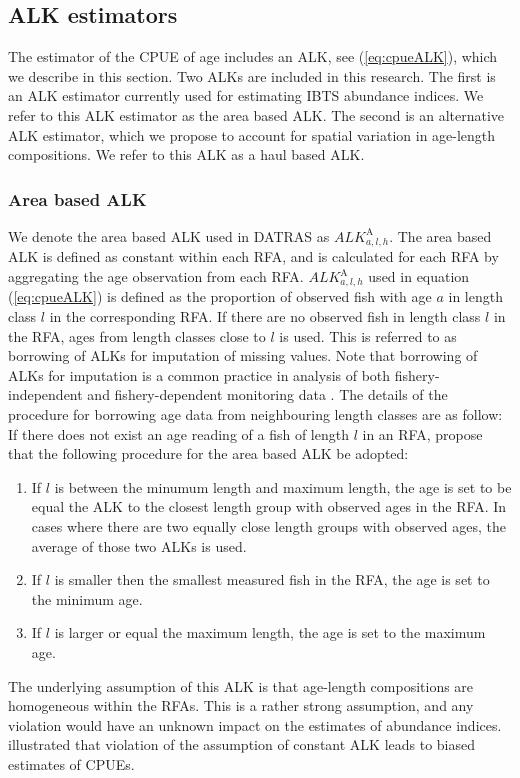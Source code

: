 \documentclass[a4paper 12pt]{article}
\numberwithin{equation}{section}
\begin{document}
\subsection{ALK estimators}
\label{sec:alkmethods}
The estimator of the CPUE of age includes an ALK, see (\ref{eq:cpueALK}), which we describe in this section. Two ALKs are included in this research. The first is an ALK estimator currently used for estimating IBTS abundance indices. We refer to this ALK estimator as the area based ALK. The second is an alternative ALK estimator, which we propose to account for spatial variation in age-length compositions. We refer to this ALK as a haul based ALK.

\subsubsection{Area based ALK}
\label{sec:datrasalkestimator}

We denote the area based ALK used in DATRAS as $ALK^{\text{A}}_{a,l,h}$. The area based ALK is defined as constant within each RFA, and is calculated for each RFA by aggregating the age observation from each RFA. $ALK^{\text{A}}_{a,l,h}$ used in equation (\ref{eq:cpueALK}) is defined as the proportion of observed fish with age $a$ in length class $l$ in the corresponding RFA. If there are no observed fish in length class $l$ in the RFA, ages from length classes close to $l$ is used. This is referred to as borrowing of ALKs for imputation of missing values. Note that borrowing of ALKs for imputation is a common practice in analysis of both fishery-independent and fishery-dependent monitoring data \citep[see for example,][]{aanes2015efficient,catchpole2017challenges}. The details of the procedure for borrowing age data from neighbouring length classes are as follow: If there does not exist an age reading of a fish of length $l$ in an RFA,  \citet{ICES2013} propose that the following procedure  for the area based ALK be adopted:
\begin{enumerate}
\item If $l$ is between the minumum length and maximum length, the age is set to be equal the ALK to the closest length group with observed ages in the RFA. In cases where there are two equally close length groups with observed ages, the average of those two ALKs is used. 
\item If $l$ is smaller then the smallest measured fish in the RFA, the age is set to the minimum age.
\item If $l$ is larger or equal the maximum length, the age is set to the maximum age.
\end{enumerate}
The underlying assumption of this ALK  is that age-length compositions are homogeneous within the RFAs. This is a rather strong assumption, and any violation would have an unknown impact on the estimates of abundance indices. \citet{aanes2015efficient} illustrated that violation of the assumption of constant ALK leads to biased estimates of CPUEs. 
\end{document}
